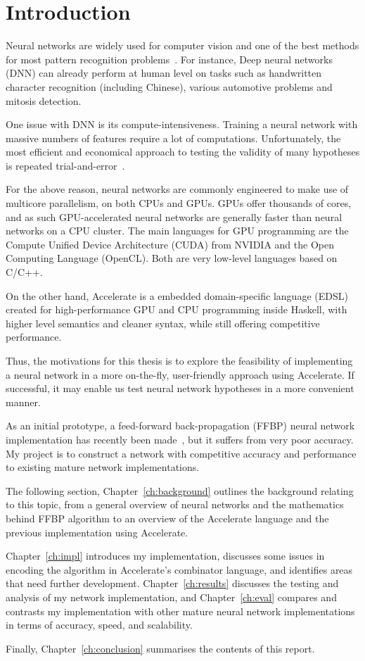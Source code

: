 \chapter{Introduction}\label{ch:intro}

Neural networks are widely used for computer vision and one of the best methods for most pattern recognition problems~\cite{Nvi14}. For instance, Deep neural networks (DNN) can already perform at human level on tasks such as handwritten character recognition (including Chinese), various automotive problems and mitosis detection.

One issue with DNN is its compute-intensiveness. Training a neural network with massive numbers of features require a lot of computations. Unfortunately, the most efficient and economical approach to testing the validity of many hypotheses is repeated trial-and-error~\cite{Ng12}.

For the above reason, neural networks are commonly engineered to make use of multicore parallelism, on both CPUs and GPUs. GPUs offer thousands of cores, and as such GPU-accelerated neural networks are generally faster than neural networks on a CPU cluster. The main languages for GPU programming are the Compute Unified Device Architecture (CUDA) from NVIDIA and the Open Computing Language (OpenCL). Both are very low-level languages based on C/C++. 

On the other hand, Accelerate is a embedded domain-specific language (EDSL) created for high-performance GPU and CPU programming inside Haskell, with higher level semantics and cleaner syntax, while still offering competitive performance. 

Thus, the motivations for this thesis is to explore the feasibility of implementing a neural network in a more on-the-fly, user-friendly approach using Accelerate. If successful, it may enable us test neural network hypotheses in a more convenient manner. 

As an initial prototype, a feed-forward back-propagation (FFBP) neural network implementation has recently been made~\cite{Eve16}, but it suffers from very poor accuracy. My project is to construct a network with competitive accuracy and performance to existing mature network implementations. 

The following section, Chapter~\ref{ch:background} outlines the background relating to this topic, from a general overview of neural networks and the mathematics behind FFBP algorithm to an overview of the Accelerate language and the previous implementation using Accelerate.

Chapter~\ref{ch:impl} introduces my implementation, discusses some issues in encoding the algorithm in Accelerate's combinator language, and identifies areas that need further development. Chapter~\ref{ch:results} discusses the testing and analysis of my network implementation, and Chapter~\ref{ch:eval} compares and contrasts my implementation with other mature neural network implementations in terms of accuracy, speed, and scalability.

Finally, Chapter~\ref{ch:conclusion} summarises the contents of this report.
